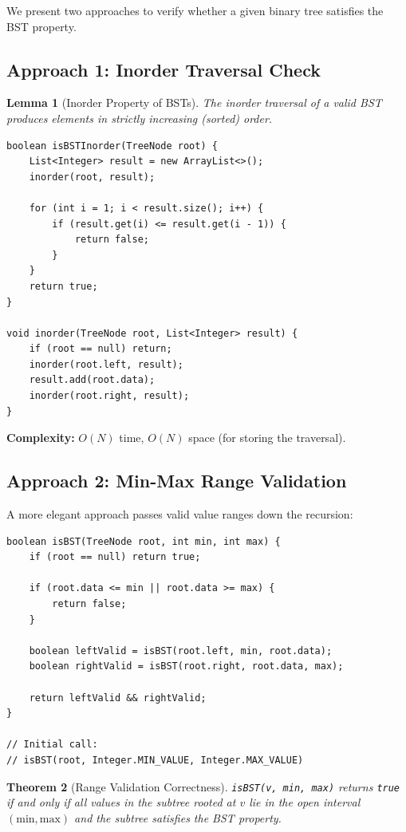 \documentclass[10pt,journal,compsoc,onecolumn]{IEEEtran}
\newtheorem{theorem}{Theorem}
\newtheorem{lemma}[theorem]{Lemma}
\begin{document}
We present two approaches to verify whether a given binary tree satisfies the BST property.

\subsection{Approach 1: Inorder Traversal Check}

\begin{lemma}[Inorder Property of BSTs]
The inorder traversal of a valid BST produces elements in strictly increasing (sorted) order.
\end{lemma}

\begin{verbatim}
boolean isBSTInorder(TreeNode root) {
    List<Integer> result = new ArrayList<>();
    inorder(root, result);
    
    for (int i = 1; i < result.size(); i++) {
        if (result.get(i) <= result.get(i - 1)) {
            return false;
        }
    }
    return true;
}

void inorder(TreeNode root, List<Integer> result) {
    if (root == null) return;
    inorder(root.left, result);
    result.add(root.data);
    inorder(root.right, result);
}
\end{verbatim}

\textbf{Complexity:} $O(N)$ time, $O(N)$ space (for storing the traversal).

\subsection{Approach 2: Min-Max Range Validation}

A more elegant approach passes valid value ranges down the recursion:

\begin{verbatim}
boolean isBST(TreeNode root, int min, int max) {
    if (root == null) return true;
    
    if (root.data <= min || root.data >= max) {
        return false;
    }
    
    boolean leftValid = isBST(root.left, min, root.data);
    boolean rightValid = isBST(root.right, root.data, max);
    
    return leftValid && rightValid;
}

// Initial call:
// isBST(root, Integer.MIN_VALUE, Integer.MAX_VALUE)
\end{verbatim}

\begin{theorem}[Range Validation Correctness]
\texttt{isBST(v, min, max)} returns \texttt{true} if and only if all values in the subtree rooted at $v$ lie in the open interval $(\text{min}, \text{max})$ and the subtree satisfies the BST property.
\end{theorem}
\end{document}
